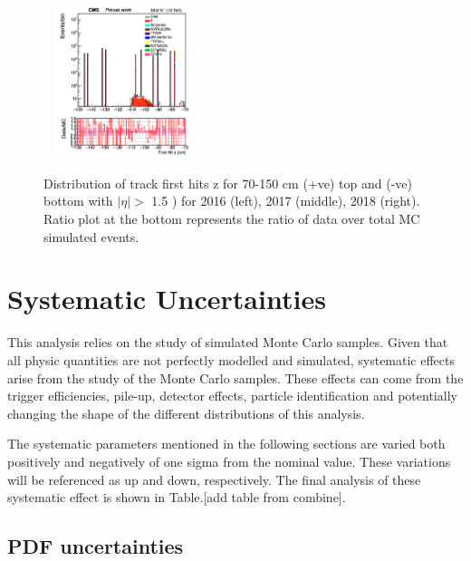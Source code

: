 \documentclass{cernatlasnote}
\begin{document}
\begin{figure}[htp]
 \includegraphics[width=4.6cm, height=4.4cm]{images/emu_channel/2018/18_Plots_for_r_z/track_Track_firstHit_z_TRK_etaGT1p5_zGT70_minus_Log.png}\\
  \caption{Distribution of  track first hits z for 70-150 cm (+ve) top and (-ve) bottom with $|\eta|>$ 1.5 ) for 2016 (left), 2017 (middle), 2018 (right). Ratio plot at the bottom represents the ratio of data over total MC simulated events.}
 \label{fig:L0DATAMC}
  \end{figure}



 
\pagebreak
\newpage
\section{Systematic Uncertainties}
\label{SEC: SYST}
This analysis relies on the study of simulated Monte Carlo samples. Given that all physic quantities are not perfectly modelled and simulated, systematic effects arise from the study of the Monte Carlo samples. These effects can come from the trigger efficiencies, pile-up, detector effects, particle identification and potentially changing the shape of the different distributions of this analysis.

The systematic parameters mentioned in the following sections are varied both positively and negatively of one sigma from the nominal value. These variations will be referenced as up and down, respectively. The final analysis of these systematic effect is shown in Table.[add table from combine].

    \subsection{PDF uncertainties}
    
\end{document}
